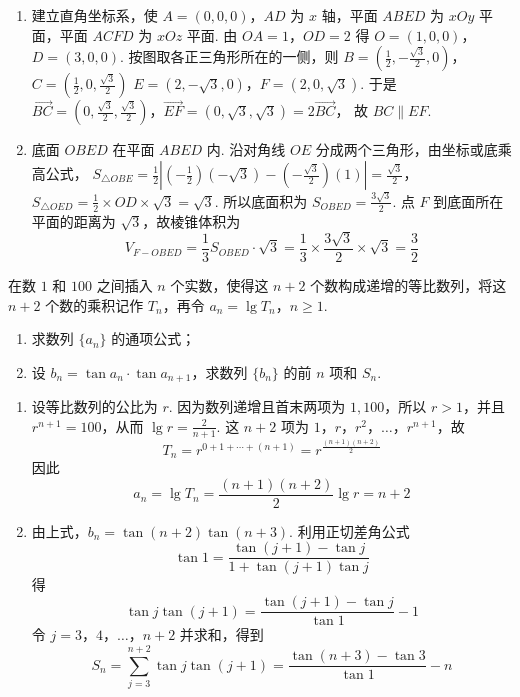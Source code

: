 \begin{solution}
\begin{enumerate}
\item 建立直角坐标系，使 \(A=(0,0,0)\)，\(AD\) 为 \(x\) 轴，平面 \(ABED\) 为 \(xOy\) 平面，平面 \(ACFD\) 为 \(xOz\) 平面. 由 \(OA=1\)，\(OD=2\) 得
\(O=(1,0,0)\)，\(D=(3,0,0)\).
按图取各正三角形所在的一侧，则
\(B=\left(\frac12,-\frac{\sqrt3}{2},0\right)\)，\(C=\left(\frac12,0,\frac{\sqrt3}{2}\right)\)
\(E=(2,-\sqrt3,0)\)，\(F=(2,0,\sqrt3)\).
于是
\(\overrightarrow{BC}=\left(0,\frac{\sqrt3}{2},\frac{\sqrt3}{2}\right)\)，\(\overrightarrow{EF}=(0,\sqrt3,\sqrt3)=2\overrightarrow{BC}\)，
故 \(BC\parallel EF\).
\item 底面 \(OBED\) 在平面 \(ABED\) 内. 沿对角线 \(OE\) 分成两个三角形，由坐标或底乘高公式，
\(S_{\triangle OBE}=\frac12\left|\left(-\frac12\right)(-\sqrt3)-\left(-\frac{\sqrt3}{2}\right)(1)\right|=\frac{\sqrt3}{2}\)，\(S_{\triangle OED}=\frac12\times OD\times\sqrt3=\sqrt3\).
所以底面积为 \(S_{OBED}=\frac{3\sqrt3}{2}\). 点 \(F\) 到底面所在平面的距离为 \(\sqrt3\)，故棱锥体积为
\[
V_{F-OBED}=\frac13S_{OBED}\cdot\sqrt3=\frac13\times\frac{3\sqrt3}{2}\times\sqrt3=\frac32
\]
\end{enumerate}
\end{solution}

\begin{problem}
在数 \(1\) 和 \(100\) 之间插入 \(n\) 个实数，使得这 \(n + 2\) 个数构成递增的等比数列，将这 \(n + 2\) 个数的乘积记作 \(T_{n}\)，再令 \(a_{n} = \lg T_{n}\)，\(n \geqslant 1\).

\begin{enumerate}
\item 求数列 \(\{a_{n}\}\) 的通项公式；
\item 设 \(b_{n} = \tan a_{n} \cdot \tan a_{n+1}\)，求数列 \(\{b_{n}\}\) 的前 \(n\) 项和 \(S_{n}\).
\end{enumerate}
\end{problem}

\begin{solution}
\begin{enumerate}
\item 设等比数列的公比为 \(r\). 因为数列递增且首末两项为 \(1,100\)，所以 \(r>1\)，并且 \(r^{n+1}=100\)，从而 \(\lg r=\frac{2}{n+1}\). 这 \(n+2\) 项为 \(1\)，\(r\)，\(r^2\)，\(\ldots\)，\(r^{n+1}\)，故
\[
T_n=r^{0+1+\cdots+(n+1)}=r^{\frac{(n+1)(n+2)}2}
\]
因此
\[
a_n=\lg T_n=\frac{(n+1)(n+2)}2\lg r=n+2
\]
\item 由上式，\(b_n=\tan(n+2)\tan(n+3)\). 利用正切差角公式
\[
\tan1=\frac{\tan(j+1)-\tan j}{1+\tan(j+1)\tan j}
\]
得
\[
\tan j\tan(j+1)=\frac{\tan(j+1)-\tan j}{\tan1}-1
\]
令 \(j=3\)，\(4\)，\(\ldots\)，\(n+2\) 并求和，得到
\[
S_n=\sum_{j=3}^{n+2}\tan j\tan(j+1)
=\frac{\tan(n+3)-\tan3}{\tan1}-n
\]
\end{enumerate}
\end{solution}


